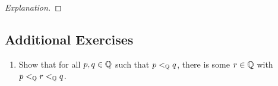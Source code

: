 \documentclass[../main.tex]{subfiles}
\begin{document}
\begin{exercise}
\begin{proof}[Explanation]
    \end{proof}
\end{exercise}

\subsection*{Additional Exercises}
\begin{enumerate}[ref={\thechapter.\arabic*}]
    \item \label{axr:3.1}Show that for all $p,q\in\mathbb{Q}$ such that $p<_{\mathbb{Q}} q$, there is some $r\in\mathbb{Q}$ with $p<_{\mathbb{Q}} r<_{\mathbb{Q}} q$.
\end{enumerate}
\end{document}
